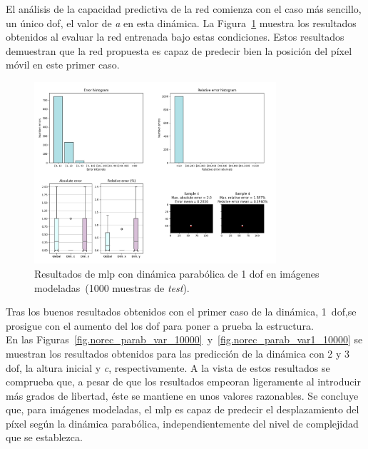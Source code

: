 El análisis de la capacidad predictiva de la red comienza con el caso más sencillo,  un único \acrshort{dof}, el valor de \textit{a} en esta dinámica. La Figura~\ref{fig.norec_parab_fix_10000} muestra los resultados obtenidos al evaluar la red entrenada bajo estas condiciones. Estos resultados demuestran que la red propuesta es capaz de predecir bien la posición del píxel móvil en este primer caso.

\begin{figure}[H]
		\begin{center}
			\includegraphics[width=0.8\textwidth]{ figures/test_mod/NOREC/parab_fix_10000.png}
			\caption{Resultados de \acrshort{mlp} con dinámica parabólica de 1 \acrshort{dof} en imágenes modeladas~(1000 muestras de \textit{test}).} 
			\label{fig.norec_parab_fix_10000}
		\end{center}
\end{figure}
\vspace{-10pt}

Tras los buenos resultados obtenidos con el primer caso de la dinámica, 1~\acrshort{dof},se prosigue con el aumento del los \acrshort{dof} para poner a prueba la estructura.\\

En las Figuras~\ref{fig.norec_parab_var_10000}~y~\ref{fig.norec_parab_var1_10000} se muestran los resultados obtenidos para las predicción de la dinámica con 2 y 3 \acrshort{dof}, la altura inicial y \textit{c}, respectivamente. A la vista de estos resultados se comprueba que, a pesar de que los resultados empeoran ligeramente al introducir más grados de libertad, éste se mantiene en unos valores razonables. Se concluye que, para imágenes modeladas, el \acrshort{mlp} es capaz de predecir el desplazamiento del píxel según la dinámica parabólica, independientemente del nivel de complejidad que se establezca.

